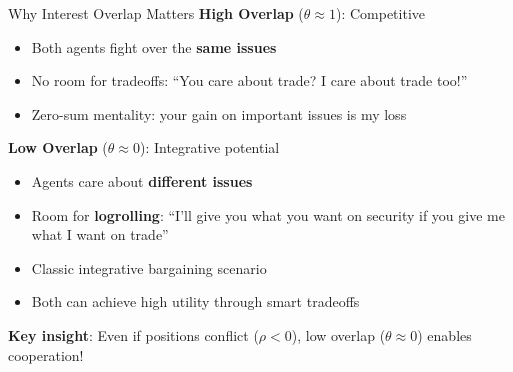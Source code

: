 \documentclass{beamer}
\begin{document}
\begin{frame}{Why Interest Overlap Matters}
\textbf{High Overlap} ($\theta \approx 1$): Competitive
\begin{itemize}
    \item Both agents fight over the \textbf{same issues}
    \item No room for tradeoffs: ``You care about trade? I care about trade too!''
    \item Zero-sum mentality: your gain on important issues is my loss
\end{itemize}

\vspace{0.5cm}

\textbf{Low Overlap} ($\theta \approx 0$): Integrative potential
\begin{itemize}
    \item Agents care about \textbf{different issues}
    \item Room for \textbf{logrolling}: ``I'll give you what you want on security if you give me what I want on trade''
    \item Classic integrative bargaining scenario
    \item Both can achieve high utility through smart tradeoffs
\end{itemize}

\vspace{0.3cm}

\textbf{Key insight}: Even if positions conflict ($\rho < 0$), low overlap ($\theta \approx 0$) enables cooperation!
\end{frame}
\end{document}
